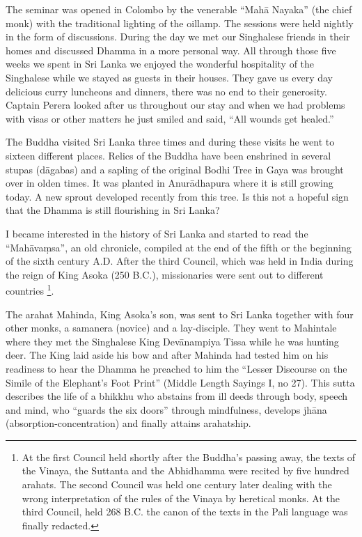 The seminar was opened in Colombo by the venerable ``Mahā Nayaka'' (the
chief monk) with the traditional lighting of the oillamp. The sessions
were held nightly in the form of discussions. During the day we met our
Singhalese friends in their homes and discussed Dhamma in a more
personal way. All through those five weeks we spent in Sri Lanka we
enjoyed the wonderful hospitality of the Singhalese while we stayed as
guests in their houses. They gave us every day delicious curry luncheons
and dinners, there was no end to their generosity. Captain Perera looked
after us throughout our stay and when we had problems with visas or
other matters he just smiled and said, ``All wounds get healed.''

The Buddha visited Sri Lanka three times and during these visits he went
to sixteen different places. Relics of the Buddha have been enshrined in
several stupas (dāgabas) and a sapling of the original Bodhi Tree in
Gaya was brought over in olden times. It was planted in Anurādhapura
where it is still growing today. A new sprout developed recently from
this tree. Is this not a hopeful sign that the Dhamma is still
flourishing in Sri Lanka?

I became interested in the history of Sri Lanka and started to read the
``Mahāvaṃsa'', an old chronicle, compiled at the end of the fifth or the
beginning of the sixth century A.D. After the third Council, which was
held in India during the reign of King Asoka (250 B.C.), missionaries
were sent out to different countries
\footnote{At the first Council held shortly
after the Buddha's passing away, the texts of the Vinaya, the Suttanta
and the Abhidhamma were recited by five hundred arahats. The second
Council was held one century later dealing with the wrong interpretation
of the rules of the Vinaya by heretical monks. At the third Council,
held 268 B.C. the canon of the texts in the Pali language was finally
redacted.}.

The arahat Mahinda, King Asoka's son, was sent to Sri Lanka together
with four other monks, a samanera (novice) and a lay-disciple. They went
to Mahintale where they met the Singhalese King Devānampiya Tissa while
he was hunting deer. The King laid aside his bow and after Mahinda had
tested him on his readiness to hear the Dhamma he preached to him the
``Lesser Discourse on the Simile of the Elephant's Foot Print'' (Middle
Length Sayings I, no 27). This sutta describes the life of a bhikkhu who
abstains from ill deeds through body, speech and mind, who ``guards the
six doors'' through mindfulness, develops jhāna
(absorption-concentration) and finally attains arahatship.

